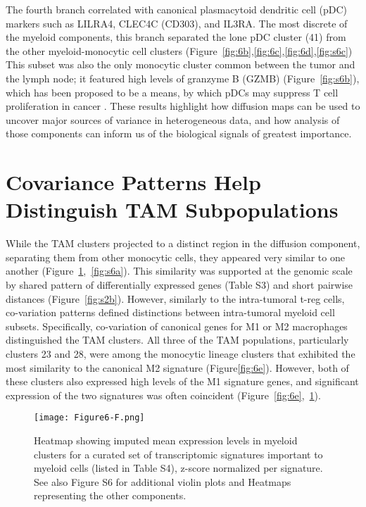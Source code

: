 The fourth branch correlated with canonical plasmacytoid dendritic cell (pDC) markers such as LILRA4, CLEC4C (CD303), and IL3RA\@.
The most discrete of the myeloid components, this branch separated the lone pDC cluster (41) from the other myeloid-monocytic cell clusters (Figure~\ref{fig:6b},\ref{fig:6c},\ref{fig:6d},\ref{fig:s6c}) This subset was also the only monocytic cluster common between the tumor and the lymph node; it featured high levels of granzyme B (GZMB) (Figure~\ref{fig:s6b}), which has been proposed to be a means, by which pDCs may suppress T cell proliferation in cancer \citep{Jahrsdoerfer2010,Swiecki2015}.
These results highlight how diffusion maps can be used to uncover major sources of variance in heterogeneous data, and how analysis of those components can inform us of the biological signals of greatest importance. 

\section{Covariance Patterns Help Distinguish TAM Subpopulations}

While the TAM clusters projected to a distinct region in the diffusion component, separating them from other monocytic cells, they appeared very similar to one another (Figure~\ref{fig:6f},~\ref{fig:s6a}).
This similarity was supported at the genomic scale by shared pattern of differentially expressed genes (Table S3) and short pairwise distances (Figure~\ref{fig:s2b}). %
However, similarly to the intra-tumoral t-reg cells, co-variation patterns defined distinctions between intra-tumoral myeloid cell subsets.
Specifically, co-variation of canonical genes for M1 or M2 macrophages distinguished the TAM clusters.
All three of the TAM populations, particularly clusters 23 and 28, were among the monocytic lineage clusters that exhibited the most similarity to the canonical M2 signature (Figure\ref{fig:6e}).
However, both of these clusters also expressed high levels of the M1 signature genes, and significant expression of the two signatures was often coincident (Figure~\ref{fig:6e},~\ref{fig:6f}).

\begin{figure}
\centering
\texttt{[image: Figure6-F.png]}
\caption{Heatmap showing imputed mean expression levels in myeloid clusters for a curated set of transcriptomic signatures important to myeloid cells (listed in Table S4), z-score normalized per signature.
See also Figure S6 for additional violin plots and Heatmaps representing the other components. %
}
\label{fig:6f}
\end{figure}

